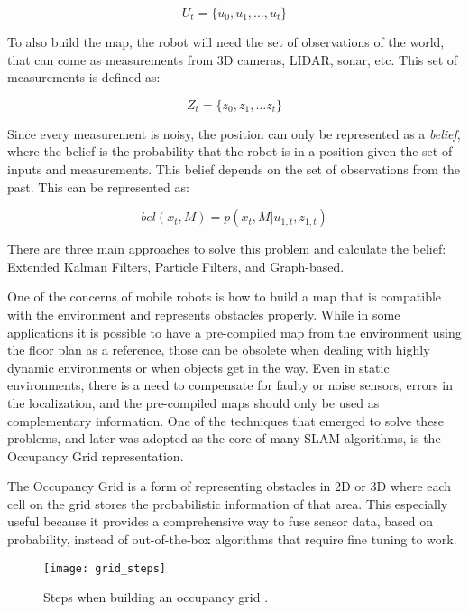\begin{equation}
    U_t = \{u_0, u_1, \dots, u_t\}
\end{equation}

To also build the map, the robot will need the set of observations of the world, that can come as measurements from 3D cameras, LIDAR, sonar, etc. This set of measurements is defined as:

\begin{equation}
    Z_t = \{z_0, z_1, \dots z_t\}
\end{equation}

Since every measurement is noisy, the position can only be represented as a \textit{belief}, where the belief is the probability that the robot is in a position given the set of inputs and measurements. This belief depends on the set of observations from the past. This can be represented as:

\begin{equation}
    bel(x_t, M) = p(x_t, M | u_{1, t}, z_{1,t})
\end{equation}

There are three main approaches to solve this problem and calculate the belief: Extended Kalman Filters, Particle Filters, and Graph-based.

One of the concerns of mobile robots is how to build a map that is compatible with the environment and represents obstacles properly. While in some applications it is possible to have a pre-compiled map from the environment using the floor plan as a reference, those can be obsolete when dealing with highly dynamic environments or when objects get in the way. Even in static environments, there is a need to compensate for faulty or noise sensors, errors in the localization, and the pre-compiled maps should only be used as complementary information. One of the techniques that emerged to solve these problems, and later was adopted as the core of many SLAM algorithms, is the Occupancy Grid \cite{elfes1989using} representation.

The Occupancy Grid is a form of representing obstacles in 2D or 3D where each cell on the grid stores the probabilistic information of that area. This especially useful because it provides a comprehensive way to fuse sensor data, based on probability, instead of out-of-the-box algorithms that require fine tuning to work.

\begin{figure}[!ht]
    \centering
    \texttt{[image: grid\_steps]}
    \caption{Steps when building an occupancy grid \cite{elfes1989using}.}
    \label{fig:grid_steps}
\end{figure}

